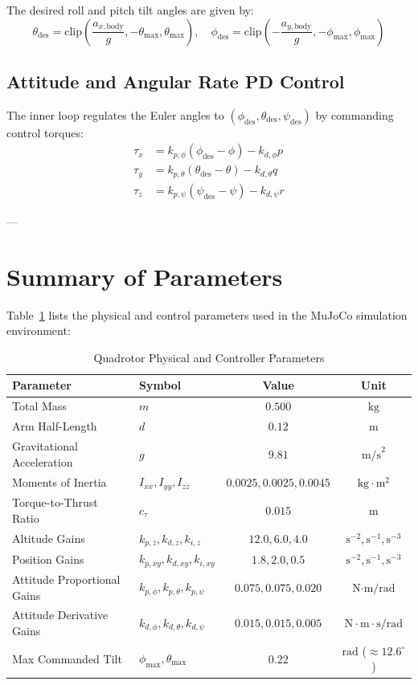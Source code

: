 \documentclass[11pt,a4paper]{article}
\begin{document}
The desired roll and pitch tilt angles are given by:
\begin{equation}
\theta_{\text{des}} = \text{clip}\left(\frac{a_{x,\text{body}}}{g}, -\theta_{\max}, \theta_{\max}\right), \quad
\phi_{\text{des}} = \text{clip}\left(-\frac{a_{y,\text{body}}}{g}, -\phi_{\max}, \phi_{\max}\right)
\end{equation}

\subsection{Attitude and Angular Rate PD Control}
The inner loop regulates the Euler angles to $(\phi_{\text{des}}, \theta_{\text{des}}, \psi_{\text{des}})$ by commanding control torques:
\begin{align}
\tau_x &= k_{p,\phi} (\phi_{\text{des}} - \phi) - k_{d,\phi} p \\
\tau_y &= k_{p,\theta} (\theta_{\text{des}} - \theta) - k_{d,\theta} q \\
\tau_z &= k_{p,\psi} (\psi_{\text{des}} - \psi) - k_{d,\psi} r
\end{align}

---

\section{Summary of Parameters}

Table~\ref{tab:params} lists the physical and control parameters used in the MuJoCo simulation environment:

\begin{table}[htbp]
\centering
\caption{Quadrotor Physical and Controller Parameters}
\label{tab:params}
\begin{tabular}{llcc}
\toprule
\textbf{Parameter} & \textbf{Symbol} & \textbf{Value} & \textbf{Unit} \\
\midrule
Total Mass & $m$ & $0.500$ & $\text{kg}$ \\
Arm Half-Length & $d$ & $0.12$ & $\text{m}$ \\
Gravitational Acceleration & $g$ & $9.81$ & $\text{m/s}^2$ \\
Moments of Inertia & $I_{xx}, I_{yy}, I_{zz}$ & $0.0025, 0.0025, 0.0045$ & $\text{kg}\cdot\text{m}^2$ \\
Torque-to-Thrust Ratio & $c_\tau$ & $0.015$ & $\text{m}$ \\
\midrule
Altitude Gains & $k_{p,z}, k_{d,z}, k_{i,z}$ & $12.0, 6.0, 4.0$ & $\text{s}^{-2}, \text{s}^{-1}, \text{s}^{-3}$ \\
Position Gains & $k_{p,xy}, k_{d,xy}, k_{i,xy}$ & $1.8, 2.0, 0.5$ & $\text{s}^{-2}, \text{s}^{-1}, \text{s}^{-3}$ \\
Attitude Proportional Gains & $k_{p,\phi}, k_{p,\theta}, k_{p,\psi}$ & $0.075, 0.075, 0.020$ & $\text{N}\cdot\text{m/rad}$ \\
Attitude Derivative Gains & $k_{d,\phi}, k_{d,\theta}, k_{d,\psi}$ & $0.015, 0.015, 0.005$ & $\text{N}\cdot\text{m}\cdot\text{s/rad}$ \\
Max Commanded Tilt & $\phi_{\max}, \theta_{\max}$ & $0.22$ & $\text{rad}$ ($\approx 12.6^\circ$) \\
\bottomrule
\end{tabular}
\end{table}
\end{document}
